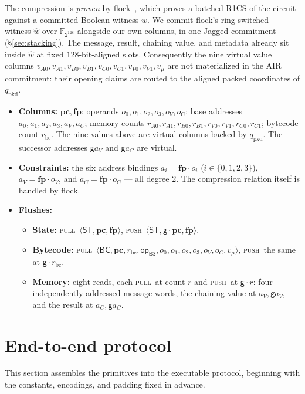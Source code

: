 \documentclass[11pt]{article}
\newcommand{\F}{\mathbb{F}}
\newcommand{\gen}{\mathsf{g}}
\newcommand{\pc}{\mathbf{pc}}
\newcommand{\fp}{\mathbf{fp}}
\newcommand{\push}{\textsc{push}}
\newcommand{\pull}{\textsc{pull}}
\newcommand{\tup}[1]{\langle #1 \rangle}
\newcommand{\dsep}[1]{\mathsf{#1}}
\newcommand{\opc}[1]{\mathsf{op}_{\mathsf{#1}}}
\begin{document}
The compression is \emph{proven} by flock~\cite{flock}, which proves a batched R1CS of the circuit against a committed Boolean witness $w$. We commit flock's ring-switched~\cite{cryptoeprint:2024/504} witness $\widehat w$ over $\F_{2^{128}}$ alongside our own columns, in one Jagged commitment (\S\ref{sec:stacking}). The message, result, chaining value, and metadata already sit inside $\widehat w$ at fixed $128$-bit-aligned slots. Consequently the nine virtual value columns $v_{A0},v_{A1},v_{B0},v_{B1},v_{C0},v_{C1},v_{V0},v_{V1},v_\mu$ are not materialized in the AIR commitment: their opening claims are routed to the aligned packed coordinates of $q_{\mathrm{pkd}}$.
\begin{itemize}
\item \textbf{Columns:} $\pc,\fp$; operands $o_0,o_1,o_2,o_3,o_V,o_C$; base addresses $a_0,a_1,a_2,a_3,a_V,a_C$; memory counts $r_{A0},r_{A1},r_{B0},r_{B1},r_{V0},r_{V1},r_{C0},r_{C1}$; bytecode count $r_{\mathrm{bc}}$. The nine values above are virtual columns backed by $q_{\mathrm{pkd}}$. The successor addresses $\gen a_V$ and $\gen a_C$ are virtual.
\item \textbf{Constraints:} the six address bindings $a_i=\fp\cdot o_i$ ($i\in\{0,1,2,3\}$), $a_V=\fp\cdot o_V$, and $a_C=\fp\cdot o_C$ — all degree $2$. The compression relation itself is handled by flock.
\item \textbf{Flushes:}
  \begin{itemize}
  \item \textbf{State:} \pull\ $\tup{\dsep{ST},\pc,\fp}$, \push\ $\tup{\dsep{ST},\gen\cdot\pc,\fp}$.
  \item \textbf{Bytecode:} \pull\ $\tup{\dsep{BC},\pc,r_{\mathrm{bc}},\opc{B3},o_0,o_1,o_2,o_3,o_V,o_C,v_\mu}$, \push\ the same at $\gen\cdot r_{\mathrm{bc}}$.
  \item \textbf{Memory:} eight reads, each \pull\ at count $r$ and \push\ at $\gen\cdot r$: four independently addressed message words, the chaining value at $a_V,\gen a_V$, and the result at $a_C,\gen a_C$.
  \end{itemize}
\end{itemize}

\section{End-to-end protocol}\label{sec:e2e}

This section assembles the primitives into the executable protocol, beginning with the constants, encodings, and padding fixed in advance.
\end{document}
